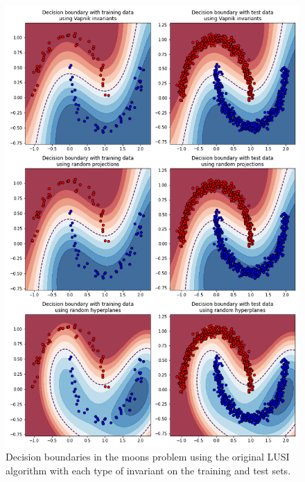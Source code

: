 \begin{figure}[H]
    \centering
    \includegraphics[width=\textwidth]{thesis/Figures/moons_decision_boundaries.png}
    \caption{Decision boundaries in the moons problem using the original LUSI algorithm with each type of
    invariant on the training and test sets.}
    \label{fig:moons_decision_boundary}
\end{figure}

